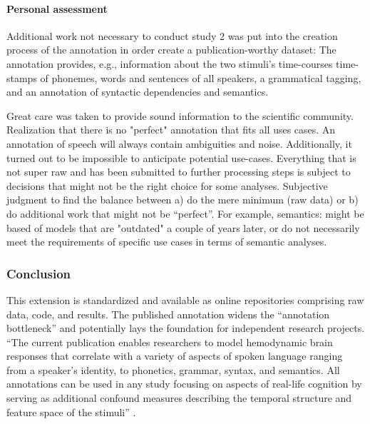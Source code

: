 \paragraph{Personal assessment}


%

%
Additional work not necessary to conduct study 2 was put into the creation
process of the annotation in order create a publication-worthy dataset:
%
The annotation provides, e.g., information about the two stimuli's time-courses
time-stamps of phonemes, words and sentences of all speakers, a grammatical
tagging, and an annotation of syntactic dependencies and semantics.

%
Great care was taken to provide sound information to the scientific community.
%
Realization that there is no "perfect" annotation that fits all uses cases.
%
An annotation of speech will always contain ambiguities and noise.
%
Additionally, it turned out to be impossible to anticipate potential use-cases.
%
Everything that is not super raw and has been submitted to further processing
steps is subject to decisions that might not be the right choice for some
analyses.
%
Subjective judgment to find the balance between
%
a) do the mere minimum (raw data) or
%
b) do additional work that might not be ``perfect''.
%
For example, semantics: might be based of models that are "outdated" a couple of
years later, or do not necessarily meet the requirements of specific use cases
in terms of semantic analyses.


\subsubsection{Conclusion}


%
This extension is standardized and available as online repositories comprising
raw data, code, and results.
%
The published annotation widens the ``annotation bottleneck''
\citep{aliko2020naturalistic} and potentially lays the foundation for
independent research projects.
%
``The current publication enables researchers to model hemodynamic brain
responses that correlate with a variety of aspects of spoken language ranging
from a speaker's identity, to phonetics, grammar, syntax, and semantics.
%
All annotations can be used in any study focusing on aspects of real-life
cognition by serving as additional confound measures describing the temporal
structure and feature space of the stimuli'' \citep{haeusler2021speechanno}.



